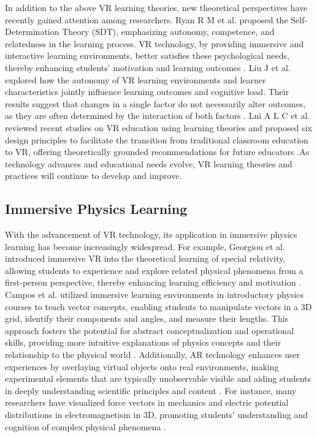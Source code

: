 \documentclass[sigconf,review,anonymous]{acmart}
\begin{document}
In addition to the above VR learning theories, new theoretical perspectives have recently gained attention among researchers. Ryan R M et al. proposed the Self-Determination Theory (SDT), emphasizing autonomy, competence, and relatedness in the learning process. VR technology, by providing immersive and interactive learning environments, better satisfies these psychological needs, thereby enhancing students' motivation and learning outcomes \cite{ryan2024self}. Liu J et al. explored how the autonomy of VR learning environments and learner characteristics jointly influence learning outcomes and cognitive load. Their results suggest that changes in a single factor do not necessarily alter outcomes, as they are often determined by the interaction of both factors \cite{liu2024autonomy}. Lui A L C et al. reviewed recent studies on VR education using learning theories and proposed six design principles to facilitate the transition from traditional classroom education to VR, offering theoretically grounded recommendations for future educators \cite{lui2023theory}.As technology advances and educational needs evolve, VR learning theories and practices will continue to develop and improve.

\subsection{Immersive Physics Learning}
With the advancement of VR technology, its application in immersive physics learning has become increasingly widespread. For example, Georgiou et al. introduced immersive VR into the theoretical learning of special relativity, allowing students to experience and explore related physical phenomena from a first-person perspective, thereby enhancing learning efficiency and motivation \cite{georgiou2021learning}. Campos et al. utilized immersive learning environments in introductory physics courses to teach vector concepts, enabling students to manipulate vectors in a 3D grid, identify their components and angles, and measure their lengths. This approach fosters the potential for abstract conceptualization and operational skills, providing more intuitive explanations of physics concepts and their relationship to the physical world \cite{campos2022impact}. Additionally, AR technology enhances user experiences by overlaying virtual objects onto real environments, making experimental elements that are typically unobservable visible and aiding students in deeply understanding scientific principles and content \cite{pegrum2021augmented, prahani2022trend}. For instance, many researchers have visualized force vectors in mechanics and electric potential distributions in electromagnetism in 3D, promoting students' understanding and cognition of complex physical phenomena \cite{al2020effectiveness, teichrew2020augmented, ismail2019enhancing, boettcher2021using}.
\end{document}

